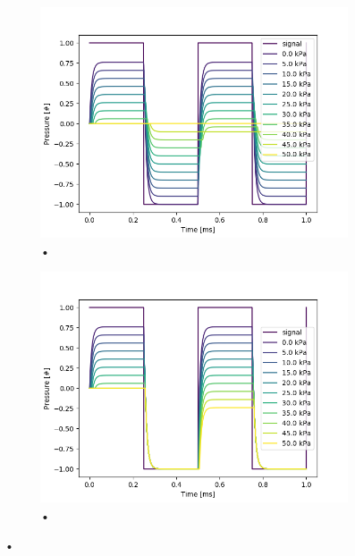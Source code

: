 \documentclass[fontsize=12pt, a4paper]{scrartcl}
\begin{document}
\begin{figure}[H]
    \centering
    \begin{subfigure}[H]{0.48\textwidth}
        \includegraphics[width=\textwidth, valign=t]{bilder/backpressure/backpressure_at_pr_in_and_pr_out.png}
        \caption{•}
    \end{subfigure}
    \begin{subfigure}[H]{0.48\textwidth}
        \includegraphics[width=\textwidth, valign=t]{bilder/backpressure/backpressure_at_pr_in.png}
        \caption{•}
    \end{subfigure}
    \caption{•}
\end{figure}
\end{document}
